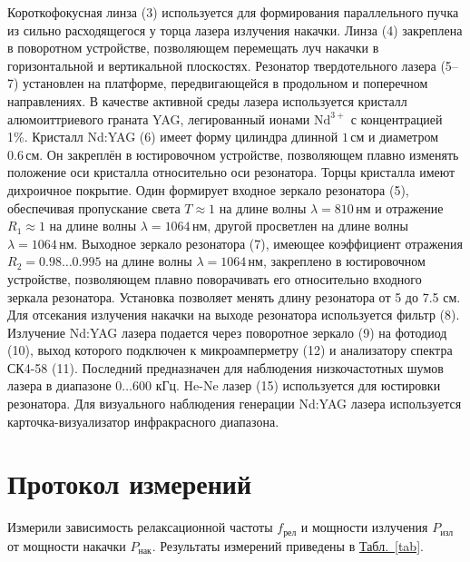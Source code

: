\documentclass[12pt]{article}
\newcommand*{\tabref}[2][]{\hyperref[#2]{Табл.~\ref*{#2}#1}}
\begin{document}
	Короткофокусная линза (3) используется для формирования параллельного пучка из сильно расходящегося у торца лазера излучения накачки. Линза (4) закреплена в поворотном устройстве, позволяющем перемещать луч накачки в горизонтальной и вертикальной плоскостях. Резонатор твердотельного лазера (5--7) установлен на платформе, передвигающейся в продольном и поперечном направлениях. В качестве активной среды лазера используется кристалл алюмоиттриевого граната YAG, легированный ионами $\mathrm{Nd}^{3+}$ с концентрацией 1\%. Кристалл Nd:YAG (6) имеет форму цилиндра длинной $1\,\text{см}$ и диаметром $0.6\,\text{см}$. Он закреплён в юстировочном устройстве, позволяющем плавно изменять положение оси кристалла относительно оси резонатора. Торцы кристалла имеют дихроичное покрытие. Один формирует входное зеркало резонатора (5), обеспечивая пропускание света $T\approx 1$ на длине волны $\lambda=810\,\text{нм}$ и отражение $R_1 \approx 1$ на длине волны $\lambda=1064\,\text{нм}$, другой просветлен на длине волны $\lambda=1064\,\text{нм}$. Выходное зеркало резонатора (7), имеющее коэффициент отражения $R_2=0.98\ldots0.995$ на длине волны $\lambda=1064\,\text{нм}$, закреплено в юстировочном устройстве, позволяющем плавно поворачивать его относительно входного зеркала резонатора. Установка позволяет менять длину резонатора от 5 до 7.5 см. Для отсекания излучения накачки на выходе резонатора используется фильтр (8). Излучение Nd:YAG лазера подается через поворотное зеркало (9) на фотодиод (10), выход которого подключен к микроамперметру (12) и анализатору спектра СК4-58 (11). Последний предназначен для наблюдения низкочастотных шумов лазера в диапазоне $0\ldots600$ кГц. He-Ne лазер (15) используется для юстировки резонатора. Для визуального наблюдения генерации Nd:YAG лазера используется карточка-визуализатор инфракрасного диапазона.

	\section{Протокол измерений}

	Измерили зависимость релаксационной частоты $f_\text{рел}$ и мощности излучения $P_\text{изл}$ от мощности накачки $P_\text{нак}$. Результаты измерений приведены в \tabref{tab}.
\end{document}
